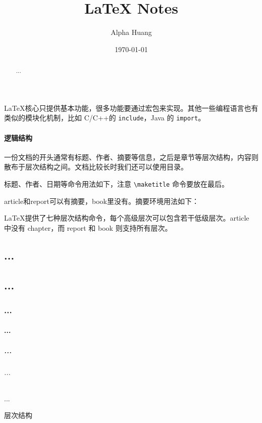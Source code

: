 \LaTeX 核心只提供基本功能，很多功能要通过宏包来实现。其他一些编程语言也有类似的模块化机制，比如 C/C++的 \texttt{include}，Java 的 \texttt{import}。

\subsection{逻辑结构}

一份文档的开头通常有标题、作者、摘要等信息，之后是章节等层次结构，内容则散布于层次结构之间。文档比较长时我们还可以使用目录。

标题、作者、日期等命令用法如下，注意 \verb|\maketitle| 命令要放在最后。

\begin{Code}[]
\title{LaTeX Notes}
\author{Alpha Huang}
\date{\today}
\maketitle
\end{Code}

article和report可以有摘要，book里没有。摘要环境用法如下：

\begin{Code}[]
\begin{abstract}
...
\end{abstract}
\end{Code}

\LaTeX 提供了七种层次结构命令，每个高级层次可以包含若干低级层次。article 中没有 chapter，而 report 和 book 则支持所有层次。

\begin{example}[h]
\begin{Code}[numbers=left]
\part{...}          %
\chapter{...}       %
\section{...}       %
\subsection{...}    %
\subsubsection{...} %
\paragraph{...}     %
\subparagraph{...}  %
\end{Code}
\caption{层次结构}
\label{tab:structure}
\end{example}

